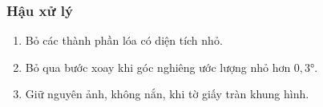\subsubsection{Hậu xử lý}
\begin{enumerate}
  \item Bỏ các thành phần lóa có diện tích nhỏ.
  \item Bỏ qua bước xoay khi góc nghiêng ước lượng nhỏ hơn $0{,}3°$.
  \item Giữ nguyên ảnh, không nắn, khi tờ giấy tràn khung hình.
\end{enumerate}
